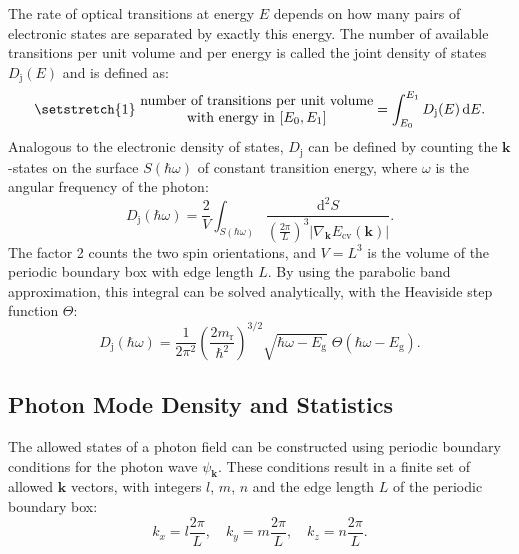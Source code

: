 The rate of optical transitions at energy $E$ depends on how many pairs of electronic
states are separated by exactly this energy. The number of available transitions
per unit volume and per energy is called the joint density of states
$D_{\mathrm{j}}(E)$ and is defined as:
\begin{equation}
	\text{\setstretch{1}
	\begin{tabular}{@{}c@{}}
		number of transitions per unit volume \\
		with energy in $[E_{0}, E_{1}]$
	\end{tabular}}= \int_{E_{0}}^{E_{1}}D_{\mathrm{j}}(E) \, \mathrm{d}E.
\end{equation}
Analogous to the electronic density of states, $D_{\mathrm{j}}$ can be defined
by counting the $\mathbf{k}$-states on the surface $S(\hbar\omega)$ of constant
transition energy, where $\omega$ is the
angular frequency of the photon:
\begin{equation}
	D_{\mathrm{j}}(\hbar \omega)= \frac{2}{V}\int_{S(\hbar \omega)}\frac{\mathrm{d}^{2}S}{\left(
	\frac{2\pi}{L}\right)^{3}\lvert \nabla_{\mathbf{k}}E_{\mathrm{cv}}(\mathbf{k}) \rvert
	}.
	\label{eq:joint_dos_surface}
\end{equation}
The factor 2 counts the two spin orientations, and $V=L^{3}$ is the volume of the
periodic boundary box with edge length $L$. By using the parabolic band approximation,
this integral can be solved analytically, with the Heaviside step function $\Theta$:
\begin{equation}
	D_{\mathrm{j}}(\hbar\omega)=\frac{1}{2\pi^{2}}\left(\frac{2m_{\mathrm{r}}}{\hbar^{2}}
	\right)^{3/2}\sqrt{\hbar\omega-E_{\mathrm{g}}}\;\Theta(\hbar\omega-E_{\mathrm{g}}
	).
\end{equation}

\subsection{Photon Mode Density and Statistics}
\label{sec:photons}

The allowed states of a photon field can be constructed using periodic boundary conditions
for the photon wave $\psi_{\mathbf{k}}$. These conditions result in a finite
set of allowed $\mathbf{k}$ vectors, with integers $l$, $m$, $n$ and the edge length
$L$ of the periodic boundary box:
\begin{equation}
	k_{x}=l \frac{2\pi}{L}, \quad k_{y}=m \frac{2\pi}{L}, \quad k_{z}=n \frac{2\pi}{L}
	.
\end{equation}

